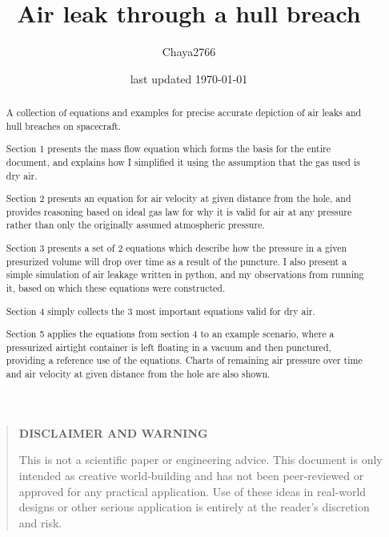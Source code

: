 \documentclass[a4paper]{article}
\title{Air leak through a hull breach}
\date{last updated \today}
\author{Chaya2766}
\begin{document}
	\sffamily
	\hyphenchar{}
	\sloppy
	
	\maketitle
	
	\textbf{
		\sloppy
		\hyphenchar{}
	}
	
	\vfill
	
	\begin{abstract}
		A collection of equations and examples for precise accurate depiction of air leaks and hull breaches on spacecraft.
		
		\medskip
		
		Section 1 presents the mass flow equation which forms the basis for the entire document, and explains how I simplified it using the assumption that the gas used is dry air.
		
		\medskip
		
		Section 2 presents an equation for air velocity at given distance from the hole, and provides reasoning based on ideal gas law for why it is valid for air at any pressure rather than only the originally assumed atmospheric pressure.
		
		\medskip
		
		Section 3 presents a set of 2 equations which describe how the pressure in a given presurized volume will drop over time as a result of the puncture. I also present a simple simulation of air leakage written in python, and my observations from running it, based on which these equations were constructed.
		
		\medskip
		
		Section 4 simply collects the 3 most important equations valid for dry air.
		
		\medskip
		
		Section 5 applies the equations from section 4 to an example scenario, where a pressurized airtight container is left floating in a vacuum and then punctured, providing a reference use of the equations. Charts of remaining air pressure over time and air velocity at given distance from the hole are also shown.
		
	\end{abstract}
	
	\vfill
	
	\begin{quote}
		\begin{center}
			\textbf{DISCLAIMER AND WARNING}
		\end{center}
		
		This is not a scientific paper or engineering advice.
		This document is only intended as creative world‑building and has not been peer‑reviewed or approved for any practical application.
		Use of these ideas in real‑world designs or other serious application is entirely at the reader’s discretion and risk.
	\end{quote}
	
\end{document}
